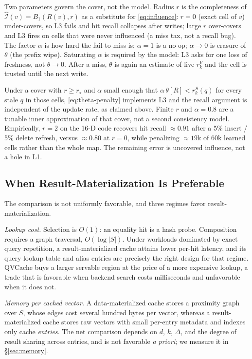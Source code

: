 Two parameters govern the cover, not the model. Radius \(r\) is the
completeness of \(\widehat{\mathcal{I}}(v)=B_1(R(v),r)\) as a
substitute for \eqref{eq:influence}: \(r{=}0\) (exact cell of \(v\))
under-covers, so L3 fails and hit recall collapses after writes;
large \(r\) over-covers and L3 fires on cells that were never
influenced (a miss tax, not a recall bug). The factor \(\alpha\) is
how hard the fail-to-miss is: \(\alpha{=}1\) is a no-op;
\(\alpha\to 0\) is erasure of \(\theta\) (the prefix wipe). Saturating
\(\alpha\) is required by the model: L3 asks for one loss of
freshness, not \(\theta\to 0\). After a miss, \(\theta\) is again an
estimate of live \(r^{V}_k\) and the cell is trusted until the next
write.

Under a cover with \(r\ge r_\star\) and \(\alpha\) small enough that
\(\alpha\,\theta[R] < r^{S}_k(q)\) for every stale \(q\) in those
cells, \eqref{eq:theta-penalty} implements L3 and the recall argument
is independent of the update rate, as claimed above. Finite \(r\) and
\(\alpha{=}0.8\) are a tunable inner approximation of that cover, not
a second consistency model. Empirically, \(r{=}2\) on the 16-D code
recovers hit recall \(\approx 0.91\) after a 5\% insert / 5\% delete
refresh, versus \(\approx 0.80\) at \(r{=}0\), while penalizing
\(\approx 19\)k of \(60\)k learned cells rather than the whole
map. The remaining error is uncovered influence, not a hole in L1.

\subsection{When Result-Materialization Is Preferable}
\label{sec:ds-limits}

The comparison is not uniformly favorable, and three regimes favor
result-materialization.

\emph{Lookup cost.} Selection is $O(1)$: an equality hit is a hash
probe. Composition requires a graph traversal, $O(\log|S|)$. Under
workloads dominated by exact query repetition, a result-materialized
cache attains lower per-hit latency, and its query lookup table and
alias entries are precisely the right design for that regime. QVCache
buys a larger servable region at the price of a more expensive lookup,
a trade that is favorable when backend search costs milliseconds and
unfavorable when it does not.

\emph{Memory per cached vector.} A data-materialized cache stores a
proximity graph over $S$, whose edges cost several hundred bytes per
vector, whereas a result-materialized cache stores raw vectors with
small per-entry metadata and indexes only cache \emph{entries}. The net
comparison depends on $d$, $k$, $\Delta$, and the degree of result
sharing across entries, and is not favorable \emph{a priori}; we
measure it in \S\ref{sec:memory}.

